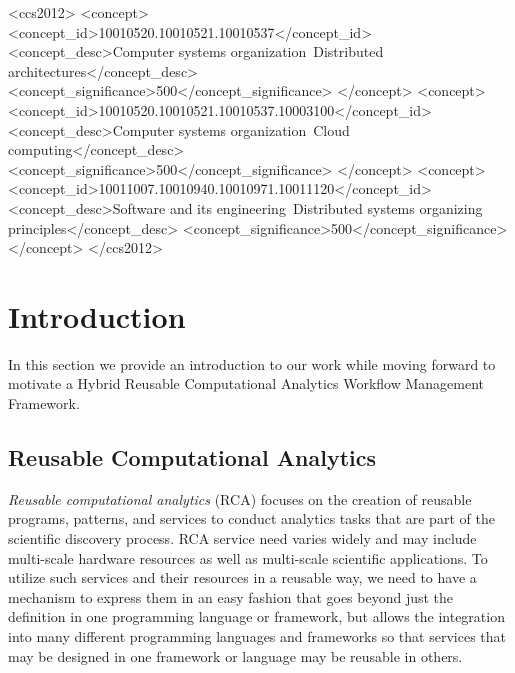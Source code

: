% 


\begin{CCSXML}
<ccs2012>
<concept>
<concept_id>10010520.10010521.10010537</concept_id>
<concept_desc>Computer systems organization~Distributed architectures</concept_desc>
<concept_significance>500</concept_significance>
</concept>
<concept>
<concept_id>10010520.10010521.10010537.10003100</concept_id>
<concept_desc>Computer systems organization~Cloud computing</concept_desc>
<concept_significance>500</concept_significance>
</concept>
<concept>
<concept_id>10011007.10010940.10010971.10011120</concept_id>
<concept_desc>Software and its engineering~Distributed systems organizing principles</concept_desc>
<concept_significance>500</concept_significance>
</concept>
</ccs2012>
\end{CCSXML}







\maketitle

% 


\section{Introduction}

In this section we provide an introduction to our work while
moving forward to motivate a 
Hybrid Reusable Computational Analytics Workflow
Management Framework.

\subsection{Reusable Computational Analytics}

{\em Reusable computational analytics} (RCA) focuses on the creation
of reusable programs, patterns, and services to conduct analytics
tasks that are part of the scientific discovery process. RCA service
need varies widely and may include multi-scale hardware resources as
well as multi-scale scientific applications. To utilize such services
and their resources in a reusable way, we need to have a mechanism to
express them in an easy fashion that goes beyond just the definition
in one programming language or framework, but allows the integration
into many different programming languages and frameworks so that
services that may be designed in one framework or language may be
reusable in others.

